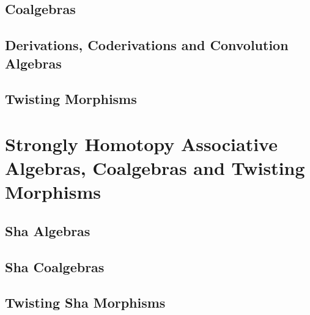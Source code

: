 \documentclass[../../thesis.tex]{subfiles}
\begin{document}
        \subsection{Coalgebras}

        \subsection{Derivations, Coderivations and Convolution Algebras}

        \subsection{Twisting Morphisms}


    \section{Strongly Homotopy Associative Algebras, Coalgebras and Twisting Morphisms}

        \subsection{Sha Algebras}

        \subsection{Sha Coalgebras}

        \subsection{Twisting Sha Morphisms}
\end{document}
